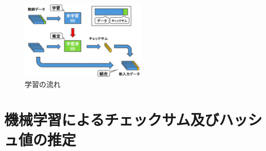 \documentclass[twocolumn, a4paper]{ieicejsp}
\begin{document}
\vspace{1mm}
\begin{figure}[htbp]
 \begin{center}
  \includegraphics[width=60mm]{namba_gakusyu.eps}
  \caption{学習の流れ}
   \label{namba}
 \end{center}
\end{figure}

\vspace{1mm}




\section{機械学習によるチェックサム及びハッシュ値の推定}
\end{document}
